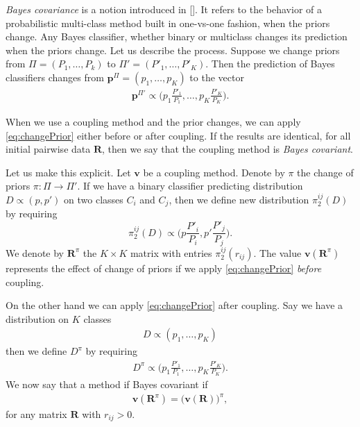 \emph{Bayes covariance} is a notion introduced in  [\cite{vsuch2016bayes}]. It refers to the behavior of a probabilistic multi-class method built in one-vs-one fashion, when the priors change. Any Bayes classifier, whether binary or multiclass changes its prediction when the priors change. Let us describe the process. Suppose we change priors from $\Pi = (P_1, \ldots, P_k)$ to $\Pi'= (P'_1, \ldots, P'_K)$. Then the prediction of Bayes classifiers changes from $\boldsymbol{p}^\Pi= (p_1, \ldots, p_K)$ to the vector 
\begin{align}
\boldsymbol{p}^{\Pi'} \propto \biggl(p_1 \frac{P'_1}{P_1}, \ldots, p_K \frac{P'_K}{P_K}\biggr). \label{eq:changePrior}
\end{align}

When we use a coupling method and the prior changes, we  can apply \eqref{eq:changePrior} either before or after coupling. If the results are identical, for all initial pairwise data $\boldsymbol{R}$, then we say that the coupling method is \emph{Bayes covariant}. 

Let us make this explicit. Let $\boldsymbol{v}$ be a coupling method. Denote by  $\pi$ the change of priors $\pi:\Pi \rightarrow \Pi'$. If we have a  binary classifier predicting distribution $D \propto (p, p')$ on two classes $C_i$ and $C_j$, then we define new distribution $\pi_2^{ij}(D)$ by requiring
$$
\pi_2^{ij}(D) \propto \biggl(p \frac{P'_i}{P_i},p' \frac{P'_j}{P_j}\biggr).
$$
We denote by $\boldsymbol{R}^\pi$ the $K\times K$ matrix with entries $\pi_2^{ij}(r_{ij})$. The value $\boldsymbol{v}(\boldsymbol{R}^\pi)$ represents the effect of change of priors if we apply \eqref{eq:changePrior} \emph{before} coupling.

On the other hand we can apply \eqref{eq:changePrior} after coupling. Say we have a distribution on $K$ classes
\begin{align}
D \propto (p_1, \ldots, p_K)
\end{align}
then we define $D^\pi$ by requiring 
\begin{align}
D^\pi \propto \biggl(p_1 \frac{P'_1}{P_1}, \ldots, p_K \frac{P'_K}{P_K}\biggr). \label{def:prior:effect}
\end{align}
We now say that a method if Bayes covariant if
\begin{align}
\boldsymbol{v}(\boldsymbol{R}^\pi)=	\bigl(\boldsymbol{v}(\boldsymbol{R})\bigr)^\pi,
\end{align}
for any matrix $\boldsymbol{R}$ with $r_{ij}> 0$.




